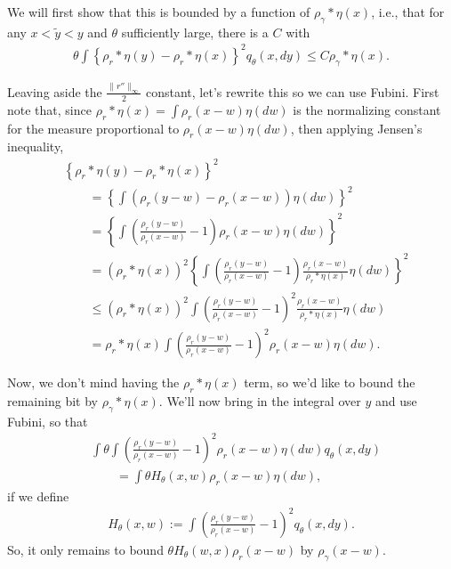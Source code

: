 \documentclass[12pt]{article}
\def \tilde{\widetilde}
\begin{document}
We will first show that this is bounded by a function of $\rho_\gamma * \eta(x)$,
i.e., that for any $x < \tilde y < y$ and $\theta$ sufficiently large,
there is a $C$ with
\begin{align} \label{eqn:goal2}
    \theta \int
    \left\{
        \rho_r * \eta(y)
        -
        \rho_r * \eta(x)
    \right\}^2 
    q_\theta(x, dy)  
\le
C \rho_\gamma * \eta(x) .
\end{align}

Leaving aside the $\frac{\|r''\|_\infty}{2}$ constant,
let's rewrite this so we can use Fubini.
First note that,
since $\rho_r *\eta(x) = \int \rho_r(x - w) \eta(dw)$
is the normalizing constant for the measure proportional to $\rho_r(x - w) \eta(dw)$,
then applying Jensen's inequality,
\begin{align}
&\left\{
            \rho_r * \eta(y)
            -
            \rho_r * \eta(x)
\right\}^2  \\
&\qquad
=
\left\{
\int
    \left(
        \rho_r(y-w)
        -
        \rho_r(x-w)
    \right)
\eta(dw)
\right\}^2  \\
&\qquad
=
\left\{
\int
    \left(
        \frac{\rho_r(y-w)}{\rho_r(x-w)}
        -
        1
    \right)
    \rho_r(x-w)
\eta(dw)
\right\}^2  \\
&\qquad
=
\left(\rho_r * \eta(x)\right)^2 \left\{
\int
    \left(
        \frac{\rho_r(y-w)}{\rho_r(x-w)}
        -
        1
    \right)
    \frac{\rho_r(x-w)}{\rho_r * \eta(x)}
\eta(dw)
\right\}^2  \\
&\qquad
\le
\left(\rho_r * \eta(x)\right)^2 
\int
    \left(
        \frac{\rho_r(y-w)}{\rho_r(x-w)}
        -
        1
    \right)^2
    \frac{\rho_r(x-w)}{\rho_r * \eta(x)}
\eta(dw) \\
&\qquad
=
\rho_r * \eta(x)
\int
    \left(
        \frac{\rho_r(y-w)}{\rho_r(x-w)}
        -
        1
    \right)^2
    \rho_r(x-w)
\eta(dw) .
\end{align}

Now, we don't mind having the $\rho_r * \eta(x)$ term,
so we'd like to bound the remaining bit by $\rho_\gamma * \eta(x)$.
We'll now bring in the integral over $y$ and use Fubini, so that
\begin{align}
&\int \theta
\int
    \left(
        \frac{\rho_r(y-w)}{\rho_r(x-w)}
        -
        1
    \right)^2
    \rho_r(x-w)
\eta(dw)
q_\theta(x, dy) \\
&\qquad
=
\int \theta H_\theta(x, w) \rho_r(x-w) \eta(dw) ,
\end{align}
if we define
\begin{align}
H_\theta(x, w)
:=
\int
    \left(
        \frac{\rho_r(y-w)}{\rho_r(x-w)}
        -
        1
    \right)^2
q_\theta(x, dy) .
\end{align}
So, it only remains to bound $\theta H_\theta (w, x) \rho_r(x-w) $ by $\rho_\gamma(x - w)$.
\end{document}
